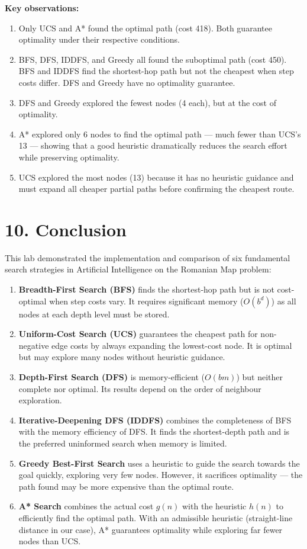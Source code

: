 \documentclass[12pt,a4paper]{article}
\begin{document}
\textbf{Key observations:}
\begin{enumerate}[leftmargin=1.6em]
  \item Only UCS and A* found the optimal path (cost 418). Both guarantee optimality under their respective conditions.
  \item BFS, DFS, IDDFS, and Greedy all found the suboptimal path (cost 450). BFS and IDDFS find the shortest-hop path but not the cheapest when step costs differ. DFS and Greedy have no optimality guarantee.
  \item DFS and Greedy explored the fewest nodes (4 each), but at the cost of optimality.
  \item A* explored only 6 nodes to find the optimal path --- much fewer than UCS's 13 --- showing that a good heuristic dramatically reduces the search effort while preserving optimality.
  \item UCS explored the most nodes (13) because it has no heuristic guidance and must expand all cheaper partial paths before confirming the cheapest route.
\end{enumerate}

\section*{10. Conclusion}

This lab demonstrated the implementation and comparison of six fundamental search strategies in Artificial Intelligence on the Romanian Map problem:

\begin{enumerate}[leftmargin=1.6em]
  \item \textbf{Breadth-First Search (BFS)} finds the shortest-hop path but is not cost-optimal when step costs vary. It requires significant memory ($O(b^d)$) as all nodes at each depth level must be stored.
  \item \textbf{Uniform-Cost Search (UCS)} guarantees the cheapest path for non-negative edge costs by always expanding the lowest-cost node. It is optimal but may explore many nodes without heuristic guidance.
  \item \textbf{Depth-First Search (DFS)} is memory-efficient ($O(bm)$) but neither complete nor optimal. Its results depend on the order of neighbour exploration.
  \item \textbf{Iterative-Deepening DFS (IDDFS)} combines the completeness of BFS with the memory efficiency of DFS. It finds the shortest-depth path and is the preferred uninformed search when memory is limited.
  \item \textbf{Greedy Best-First Search} uses a heuristic to guide the search towards the goal quickly, exploring very few nodes. However, it sacrifices optimality --- the path found may be more expensive than the optimal route.
  \item \textbf{A* Search} combines the actual cost $g(n)$ with the heuristic $h(n)$ to efficiently find the optimal path. With an admissible heuristic (straight-line distance in our case), A* guarantees optimality while exploring far fewer nodes than UCS.
\end{enumerate}
\end{document}
